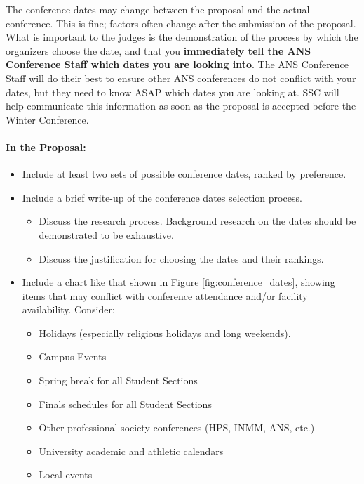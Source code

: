 \documentclass[12pt]{article}
\begin{document}
The conference dates may change between the proposal and the actual conference. This is fine; factors often change after the submission of the proposal. What is important to the judges is the demonstration of the process by which the organizers choose the date, and that you \textbf{immediately tell the ANS Conference Staff which dates you are looking into}. The ANS Conference Staff will do their best to ensure other ANS conferences do not conflict with your dates, but they need to know ASAP which dates you are looking at. SSC will help communicate this information as soon as the proposal is accepted before the Winter Conference.

\paragraph{In the Proposal:}
\begin{itemize}
    \item{Include at least two sets of possible conference dates, ranked by preference.}
    \item{Include a brief write-up of the conference dates selection process.
    \begin{itemize}
        \item{Discuss the research process. Background research on the dates should be demonstrated to be exhaustive.}
        \item{Discuss the justification for choosing the dates and their rankings.}
    \end{itemize}
    }
    \item{Include a chart like that shown in Figure \ref{fig:conference_dates}, showing items that may conflict with
    conference attendance and/or facility availability. Consider:
    \begin{itemize}
        \item{Holidays (especially religious holidays and long weekends).}
        \item{Campus Events}
        \item{Spring break for all Student Sections}
        \item{Finals schedules for all Student Sections}
        \item{Other professional society conferences (HPS, INMM, ANS, etc.)}
        \item{University academic and athletic calendars}
        \item{Local events}
    \end{itemize}
    }
\end{itemize}
\end{document}
